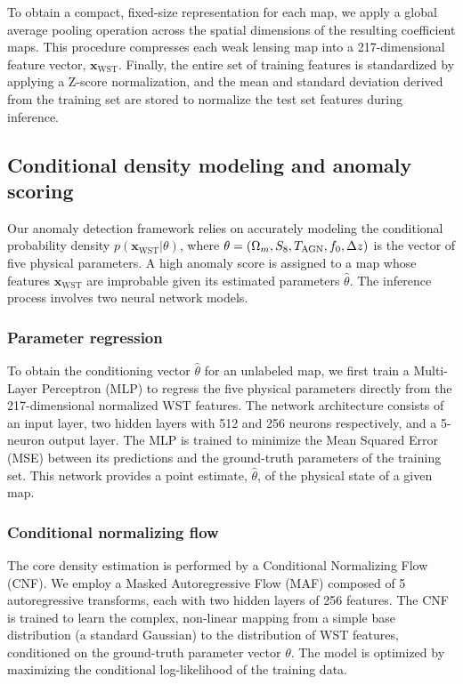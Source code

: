 \documentclass[]{article}
\begin{document}
To obtain a compact, fixed-size representation for each map, we apply a global average pooling operation across the spatial dimensions of the resulting coefficient maps. This procedure compresses each weak lensing map into a 217-dimensional feature vector, $\mathbf{x}_{\text{WST}}$. Finally, the entire set of training features is standardized by applying a Z-score normalization, and the mean and standard deviation derived from the training set are stored to normalize the test set features during inference.

\subsection{Conditional density modeling and anomaly scoring}
Our anomaly detection framework relies on accurately modeling the conditional probability density $p(\mathbf{x}_{\text{WST}} | \theta)$, where $\theta = (\Omega_m, S_8, T_{\rm AGN}, f_0, \Delta z)$ is the vector of five physical parameters. A high anomaly score is assigned to a map whose features $\mathbf{x}_{\text{WST}}$ are improbable given its estimated parameters $\hat{\theta}$. The inference process involves two neural network models.

\subsubsection{Parameter regression}
To obtain the conditioning vector $\hat{\theta}$ for an unlabeled map, we first train a Multi-Layer Perceptron (MLP) to regress the five physical parameters directly from the 217-dimensional normalized WST features. The network architecture consists of an input layer, two hidden layers with 512 and 256 neurons respectively, and a 5-neuron output layer. The MLP is trained to minimize the Mean Squared Error (MSE) between its predictions and the ground-truth parameters of the training set. This network provides a point estimate, $\hat{\theta}$, of the physical state of a given map.

\subsubsection{Conditional normalizing flow}
The core density estimation is performed by a Conditional Normalizing Flow (CNF). We employ a Masked Autoregressive Flow (MAF) composed of 5 autoregressive transforms, each with two hidden layers of 256 features. The CNF is trained to learn the complex, non-linear mapping from a simple base distribution (a standard Gaussian) to the distribution of WST features, conditioned on the ground-truth parameter vector $\theta$. The model is optimized by maximizing the conditional log-likelihood of the training data.
\end{document}
